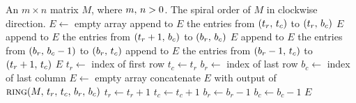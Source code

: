 
\begin{algorithmic}[1]
\Require An $m \times n$ matrix $M$, where ${m},\, {n} > 0$.
\Ensure The spiral order of $M$ in clockwise direction.
\State $E \gets$ empty array
\State append to $E$ the entries from $\left( {t_r},\, {t_c} \right)$ to $\left( {t_r},\, {b_c} \right)$
  \State \Return $E$
\EndIf
\State append to $E$ the entries from $\left( {t_r+1},\, {b_c} \right)$ to $\left( {b_r},\, {b_c} \right)$
  \State \Return $E$
\EndIf
\State append to $E$ the entries from $\left( {b_r},\, {b_c-1} \right)$ to $\left( {b_r},\, {t_c} \right)$
\State append to $E$ the entries from $\left( {b_r-1},\, {t_c} \right)$ to $\left( {t_r+1},\, {t_c} \right)$
\State \Return $E$
\EndFunction
\State $t_r \gets$ index of first row
\State $t_c \gets t_r$
\State $b_r \gets$ index of last row
\State $b_c \gets$ index of last column
\State $E \gets$ empty array
  \State concatenate $E$ with output of $\textproc{ring}(\TupleE{M}{t_r}{t_c}{b_r}{b_c})$
  \State $t_r \gets t_r + 1$
  \State $t_c \gets t_c + 1$
  \State $b_r \gets b_r - 1$
  \State $b_c \gets b_c - 1$
\EndWhile
\State \Return $E$
\end{algorithmic}
